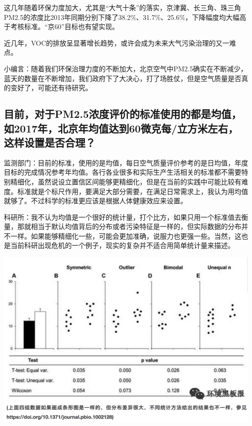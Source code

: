 \documentclass[
]{book}
\begin{document}
这几年随着环保力度加大，尤其是``大气十条''的落实，京津冀、长三角、珠三角PM2.5的浓度比2013年同期分别下降了38.2\%、31.7\%、25.6\%，下降幅度均大幅高于考核标准。``京60''目标也有望实现。

近几年，VOC的排放呈显著增长趋势，或许会成为未来大气污染治理的又一难点。

小编言：随着我们环保治理力度的不断加大，北京空气中PM2.5确实在不断减少，蓝天的数量在不断增加，我们政府下了大决心，打了场胜仗，但是空气质量是否真的变好了，可能还有待研究。

\hypertarget{ux76eeux524dux5bf9ux4e8epm2.5ux6d53ux5ea6ux8bc4ux4ef7ux7684ux6807ux51c6ux4f7fux7528ux7684ux90fdux662fux5747ux503cux59822017ux5e74ux5317ux4eacux5e74ux5747ux503cux8fbeux523060ux5faeux514bux6bcfux7acbux65b9ux7c73ux5de6ux53f3ux8fd9ux6837ux8bbeux7f6eux662fux5426ux5408ux7406}{%
\subsection{目前，对于PM2.5浓度评价的标准使用的都是均值，如2017年，北京年均值达到60微克每/立方米左右，这样设置是否合理？}\label{ux76eeux524dux5bf9ux4e8epm2.5ux6d53ux5ea6ux8bc4ux4ef7ux7684ux6807ux51c6ux4f7fux7528ux7684ux90fdux662fux5747ux503cux59822017ux5e74ux5317ux4eacux5e74ux5747ux503cux8fbeux523060ux5faeux514bux6bcfux7acbux65b9ux7c73ux5de6ux53f3ux8fd9ux6837ux8bbeux7f6eux662fux5426ux5408ux7406}}

监测部门：目前的标准，使用的是均值，每日空气质量评价参考的是日均值，年度目标的完成情况参考年均值。各行各业很多和实际生产生活相关的标准都不需要特别精细化，虽然说设立置信区间能够更精细化，但是在当前的实践中可能比较有难度。标准就是个标尺作用，要满足大部分需要，在满足日常需求上，我认为用均值就够了。不过科学的标准更应该是根据人体健康效应来设置。

科研所：我不认为均值是一个很好的统计量，打个比方，如果只用一个标准值去衡量，那就相当于默认均值背后的分布或者污染特征是一样的，但实际数据的分布并不一样。如果能够精细化一些，可能会更加准确，说服力也更强一些。当然，这也是当前科研出现危机的一个例子，现实的复杂并不适合用简单统计量来描述。

\includegraphics[width=8.33in]{images/air3}
\end{document}
